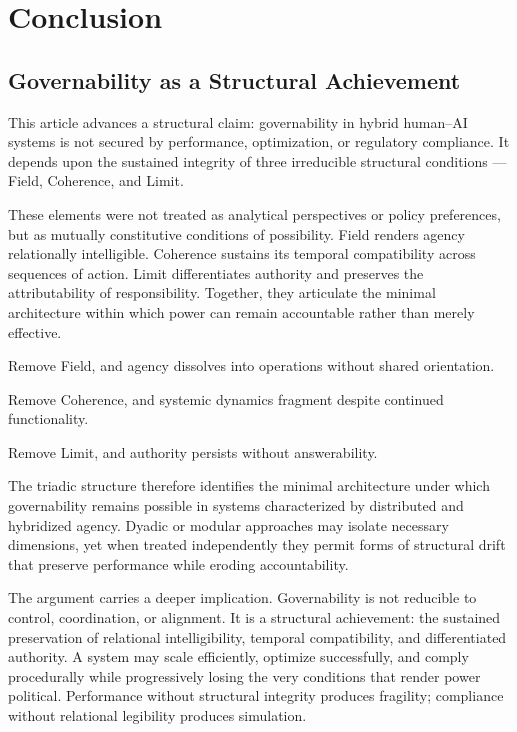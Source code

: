 \documentclass[12pt]{article}
\begin{document}
\section{Conclusion}


\subsection*{Governability as a Structural Achievement}


This article advances a structural claim: governability in hybrid human–AI systems is not secured by performance, optimization, or regulatory compliance. It depends upon the sustained integrity of three irreducible structural conditions — Field, Coherence, and Limit.

These elements were not treated as analytical perspectives or policy preferences, but as mutually constitutive conditions of possibility. Field renders agency relationally intelligible. Coherence sustains its temporal compatibility across sequences of action. Limit differentiates authority and preserves the attributability of responsibility. Together, they articulate the minimal architecture within which power can remain accountable rather than merely effective.

Remove Field, and agency dissolves into operations without shared orientation.

Remove Coherence, and systemic dynamics fragment despite continued functionality.

Remove Limit, and authority persists without answerability.

The triadic structure therefore identifies the minimal architecture under which governability remains possible in systems characterized by distributed and hybridized agency. Dyadic or modular approaches may isolate necessary dimensions, yet when treated independently they permit forms of structural drift that preserve performance while eroding accountability.

The argument carries a deeper implication. Governability is not reducible to control, coordination, or alignment. It is a structural achievement: the sustained preservation of relational intelligibility, temporal compatibility, and differentiated authority. A system may scale efficiently, optimize successfully, and comply procedurally while progressively losing the very conditions that render power political. Performance without structural integrity produces fragility; compliance without relational legibility produces simulation.
\end{document}
